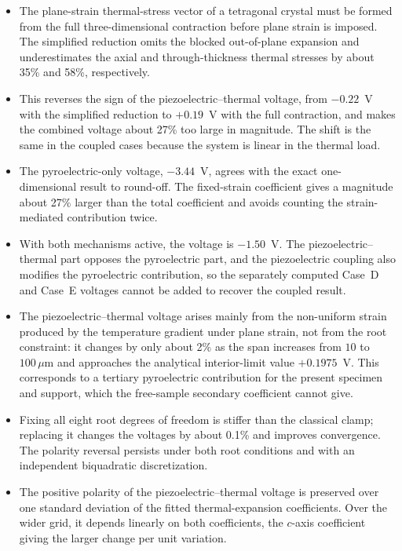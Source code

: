 \documentclass[a4paper,12pt]{elsarticle}
\begin{document}
\begin{itemize}
\item The plane-strain thermal-stress vector of a tetragonal crystal must be formed from
the full three-dimensional contraction before plane strain is imposed. The simplified
reduction omits the blocked out-of-plane expansion and underestimates the axial and
through-thickness thermal stresses by about 35\% and 58\%, respectively.

\item This reverses the sign of the piezoelectric--thermal voltage, from $-0.22$~V with
the simplified reduction to $+0.19$~V with the full contraction, and makes the combined
voltage about 27\% too large in magnitude. The shift is the same in the coupled cases
because the system is linear in the thermal load.

\item The pyroelectric-only voltage, $-3.44$~V, agrees with the exact one-dimensional
result to round-off. The fixed-strain coefficient gives a magnitude about 27\% larger than
the total coefficient and avoids counting the strain-mediated contribution twice.

\item With both mechanisms active, the voltage is $-1.50$~V. The piezoelectric--thermal
part opposes the pyroelectric part, and the piezoelectric coupling also modifies the
pyroelectric contribution, so the separately computed Case~D and Case~E voltages cannot be
added to recover the coupled result.

\item The piezoelectric--thermal voltage arises mainly from the non-uniform strain produced
by the temperature gradient under plane strain, not from the root constraint: it changes by
only about 2\% as the span increases from $10$ to $100\,\mu\text{m}$ and approaches the
analytical interior-limit value $+0.1975$~V. This corresponds to a tertiary pyroelectric
contribution for the present specimen and support, which the free-sample secondary
coefficient cannot give.

\item Fixing all eight root degrees of freedom is stiffer than the classical clamp;
replacing it changes the voltages by about 0.1\% and improves convergence. The polarity
reversal persists under both root conditions and with an independent biquadratic
discretization.

\item The positive polarity of the piezoelectric--thermal voltage is preserved over one
standard deviation of the fitted thermal-expansion coefficients. Over the wider grid, it
depends linearly on both coefficients, the $c$-axis coefficient giving the larger change per
unit variation.
\end{itemize}
\end{document}
